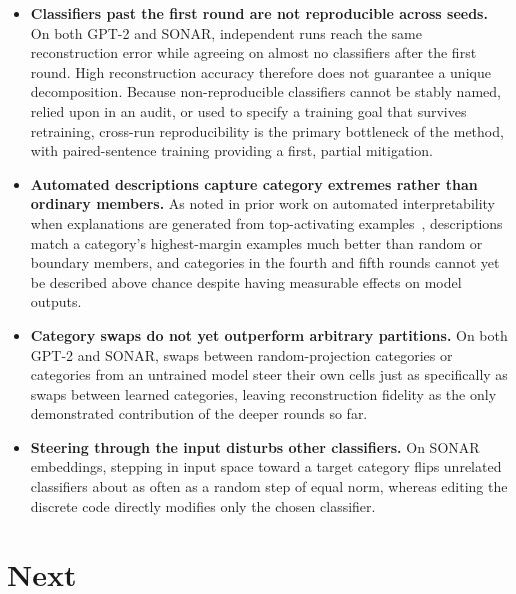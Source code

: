 \documentclass[11pt]{article}
\begin{document}
\begin{itemize}
\item \textbf{Classifiers past the first round are not reproducible across
seeds.} On both GPT-2 and SONAR, independent runs reach the same
reconstruction error while agreeing on almost no classifiers after the
first round. High reconstruction accuracy therefore does not guarantee a
unique decomposition. Because non-reproducible classifiers cannot be
stably named, relied upon in an audit, or used to specify a training goal
that survives retraining, cross-run reproducibility is the primary
bottleneck of the method, with paired-sentence training providing a
first, partial mitigation.
\item \textbf{Automated descriptions capture category extremes rather than
ordinary members.} As noted in prior work on automated interpretability
when explanations are generated from top-activating
examples~\cite{paulo2025}, descriptions match a category's highest-margin
examples much better than random or boundary members, and categories in
the fourth and fifth rounds cannot yet be described above chance despite
having measurable effects on model outputs.
\item \textbf{Category swaps do not yet outperform arbitrary partitions.}
On both GPT-2 and SONAR, swaps between random-projection categories or
categories from an untrained model steer their own cells just as
specifically as swaps between learned categories, leaving reconstruction
fidelity as the only demonstrated contribution of the deeper rounds so
far.
\item \textbf{Steering through the input disturbs other classifiers.}
On SONAR embeddings, stepping in input space toward a target category
flips unrelated classifiers about as often as a random step of equal norm,
whereas editing the discrete code directly modifies only the chosen
classifier.
\end{itemize}

\section*{Next}
\end{document}
